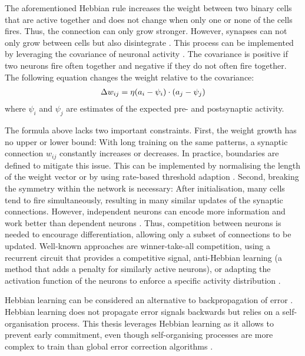 The aforementioned Hebbian rule increases the weight between two binary cells that are active together and does not change when only one or none of the cells fires. Thus, the connection can only grow stronger.
However, synapses can not only grow between cells but also disintegrate .
This process can be implemented by leveraging the covariance of neuronal activity .
The covariance is positive if two neurons fire often together and negative if they do not often fire together.
The following equation changes the weight relative to the covariance:
%
\begin{align}\eqlbl{hebb_2}
	\Delta w_{ij} = \eta (a_i - \psi_i) \cdot (a_j - \psi_j)
\end{align}
%
where \(\psi_i\) and \(\psi_j\) are estimates of the expected pre- and postsynaptic activity.

The formula above lacks two important constraints.
First, the weight growth has no upper or lower bound: With long training on the same patterns, a synaptic connection $w_{ij}$ constantly increases or decreases. In practice, boundaries are defined to mitigate this issue. This can be implemented by normalising the length of the weight vector \cite{oja_simplified_1982} or by using rate-based threshold adaption .
Second, breaking the symmetry within the network is necessary: After initialisation, many cells tend to fire simultaneously, resulting in many similar updates of the synaptic connections. However, independent neurons can encode more information and work better than dependent neurons .
Thus, competition between neurons is needed to encourage differentiation, allowing only a subset of connections to be updated.
Well-known approaches are winner-take-all competition, using a recurrent circuit that provides a competitive signal, anti-Hebbian learning  (a method that adds a penalty for similarly active neurons), or adapting the activation function of the neurons to enforce a specific activity distribution .

Hebbian learning can be considered an alternative to backpropagation of error \cite{rosenblatt_principles_1962, linnainmaa_taylor_1976}.
Hebbian learning does not propagate error signals backwards but relies on a self-organisation process.
This thesis leverages Hebbian learning as it allows to prevent early commitment, even though self-organising processes are more complex to train than global error correction algorithms .


